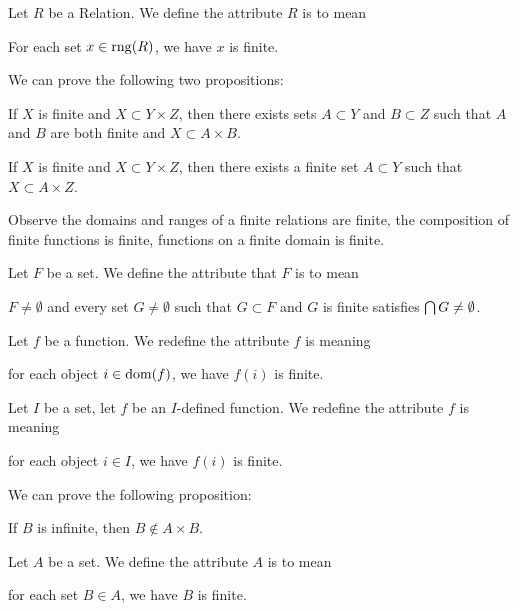 \documentclass{article}
\begin{document}
\begin{definition}
Let $R$ be a Relation. We define the attribute $R$ is
 to mean
\begin{defn}
\item For each set $x\in\operatorname{rng}(R)$, we have $x$ is finite.
\end{defn}
\end{definition}

We can prove the following two propositions:
\begin{thm}
\item\label{finset1:13} If $X$ is finite and $X\subset Y\times Z$,
  then there exists sets $A\subset Y$ and $B\subset Z$ such that $A$ and
  $B$ are both finite and $X\subset A\times B$.
\item\label{finset1:14} If $X$ is finite and $X\subset Y\times Z$,
  then there exists a finite set $A\subset Y$ such that $X\subset A\times Z$.
\end{thm}

Observe the domains and ranges of a finite relations are finite,
the composition of finite functions is finite,
functions on a finite domain is finite.

\begin{definition}
Let $F$ be a set.
We define the attribute that $F$ is  to mean
\begin{defn}
\item $F\neq\emptyset$ and every set $G\neq\emptyset$ such that
  $G\subset F$ and $G$ is finite satisfies $\bigcap G\neq\emptyset$.
\end{defn}
\end{definition}

\begin{definition}
Let $f$ be a function.
We redefine the attribute $f$ is  meaning
\begin{defn}
\item for each object $i\in\operatorname{dom}(f)$, we have $f(i)$ is finite.
\end{defn}
\end{definition}

\begin{definition}
Let $I$ be a set, let $f$ be an $I$-defined function.
We redefine the attribute $f$ is  meaning
\begin{defn}
\item for each object $i\in I$, we have $f(i)$ is finite.
\end{defn}
\end{definition}

We can prove the following proposition:
\begin{thm}
\item\label{finset1:15} If $B$ is infinite, then $B\notin A\times B$.
\end{thm}

\begin{definition}
Let $A$ be a set.
We define the attribute $A$ is  to mean
\begin{defn}
\item for each set $B\in A$, we have $B$ is finite.
\end{defn}
\end{definition}
\end{document}
